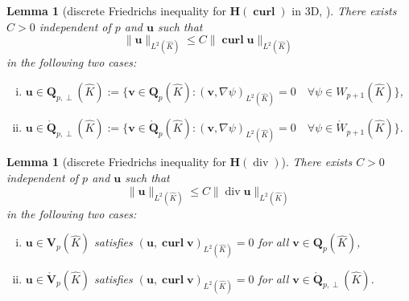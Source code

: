 \documentclass{article}
\newtheorem{lemma}[theorem]{Lemma}
\begin{document}
\begin{lemma}
[discrete Friedrichs inequality for $\mathbf{H}(\operatorname{\mathbf{curl}})$ in 3D, ]
\label{lemma:discrete-friedrichs-3d}
There exists $C > 0$ independent of $p$ and ${\mathbf{u}}$ such that
\begin{equation}
\label{eq:lemma:discrete-friedrichs-3d}\|{\mathbf{u}}\|_{L^{2}(\widehat{K})}
\leq C \|\operatorname{\mathbf{curl}} {\mathbf{u}}\|_{L^{2}(\widehat{K})}%
\end{equation}
in the following two cases:

\begin{enumerate}
[(i)]

\item \label{item:lemma:discrete-friedrichs-3d-i} ${\mathbf{u}}\in
\mathbf{Q}_{p,\perp}(\widehat{K}) := \{ {\mathbf v} \in \mathbf{Q}_p(\widehat K)\colon({\mathbf{v}},\nabla \psi)_{L^{2}(\widehat{K})}=0 \quad \forall \psi\in W_{p+1}(\widehat{K})\}$,

\item \label{item:lemma:discrete-friedrichs-3d-ii} ${\mathbf{u}} \in
\mathring{\mathbf{Q}}_{p,\perp}(\widehat{K}):=\{ {\mathbf v} \in \mathring{\mathbf{Q}}_p(\widehat K)\colon
({\mathbf v},\nabla \psi)_{L^2(\widehat K)} = 0 \quad \forall \psi \in \mathring{W}_{p+1}(\widehat K)\}$.
\end{enumerate}
\end{lemma}

\begin{lemma}
[discrete Friedrichs inequality for $\mathbf{H}(\operatorname*{div})$]

\label{lemma:discrete-friedrichs-div} There exists $C > 0$ independent of $p$
and ${\mathbf{u}}$ such that
\begin{equation}
\label{eq:lemma:discrete-friedrichs-div-3d}\|{\mathbf{u}}\|_{L^{2}(\widehat{K})} \leq C
\|\operatorname{div} {\mathbf{u}}\|_{L^{2}(\widehat{K})}%
\end{equation}
in the following two cases:

\begin{enumerate}
[(i)]

\item \label{item:lemma:discrete-friedrichs-div-i} ${\mathbf{u}}\in
\mathbf{V}_{p}(\widehat{K})$ satisfies $({\mathbf{u}%
},\operatorname*{\mathbf{curl}} \mathbf{v})_{L^{2}(\widehat{K})}=0$ for all $\mathbf{v}\in \mathbf{Q}_{p}(\widehat{K})$,

\item \label{item:lemma:discrete-friedrichs-div-ii} ${\mathbf{u}} \in
\mathring{\mathbf{V}}_p(\widehat{K})$ satisfies $({\mathbf{u}}, \operatorname*{\mathbf{curl}} \mathbf{v})_{L^{2}(\widehat{K})} = 0$
for all $\mathbf{v} \in\mathring{\mathbf{Q}}_{p,\perp}(\widehat{K})$.
\end{enumerate}
\end{lemma}
\end{document}
